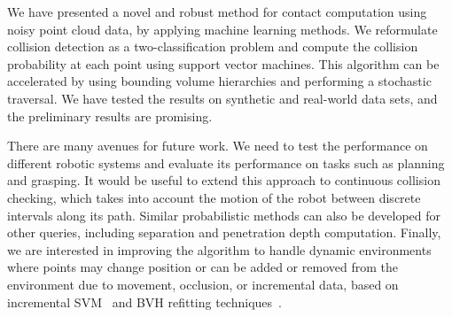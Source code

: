 We have presented a novel and robust method for contact computation using noisy point cloud data, by applying machine learning methods.
We reformulate collision detection as a two-classification problem and compute the collision probability at each point using
support vector machines. This algorithm can be accelerated by using bounding volume hierarchies and performing a stochastic traversal. We have tested
the results on synthetic and real-world data sets, and the preliminary results are promising.

There are many avenues for future work. We need to test the performance on different robotic systems and evaluate its performance
on tasks such as planning and grasping.
It would be useful to extend this approach to continuous collision checking, which takes into account the motion of the robot
between discrete intervals along its path. Similar probabilistic methods can also be developed for other queries,
including separation and penetration depth computation. Finally, we are interested in improving the algorithm to handle dynamic environments where points may change position or can be added or removed from the environment due to movement, occlusion, or incremental data, based on incremental SVM~\cite{Gert:nips:2001} and BVH refitting techniques~\cite{Lauterbach10}.

